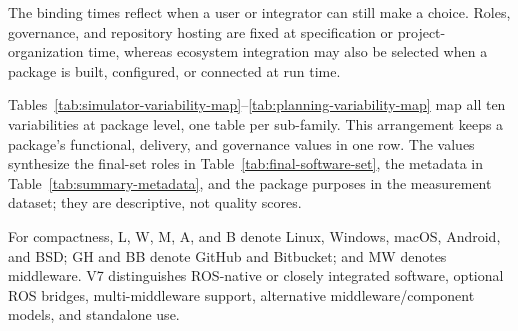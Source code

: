 The binding times reflect when a user or integrator can still make a choice. Roles, governance, and repository hosting are fixed at specification or project-organization time, whereas ecosystem integration may also be selected when a package is built, configured, or connected at run time.

Tables~\ref{tab:simulator-variability-map}--\ref{tab:planning-variability-map} map all ten variabilities at package level, one table per sub-family. This arrangement keeps a package's functional, delivery, and governance values in one row. The values synthesize the final-set roles in Table~\ref{tab:final-software-set}, the metadata in Table~\ref{tab:summary-metadata}, and the package purposes in the measurement dataset; they are descriptive, not quality scores.

For compactness, L, W, M, A, and B denote Linux, Windows, macOS, Android, and BSD; GH and BB denote GitHub and Bitbucket; and MW denotes middleware. V7 distinguishes ROS-native or closely integrated software, optional ROS bridges, multi-middleware support, alternative middleware/component models, and standalone use.

\newcommand{\variationmapheader}{%
\toprule
\textbf{Software} & \textbf{V1 Role} & \textbf{V2 Interact.} & \textbf{V3 Scope} & \textbf{V4 Execution} & \textbf{V5 Platform} & \textbf{V6 Languages} & \textbf{V7 Integration} & \textbf{V8 License} & \textbf{V9 Governance} & \textbf{V10 Host} \\
\midrule}


